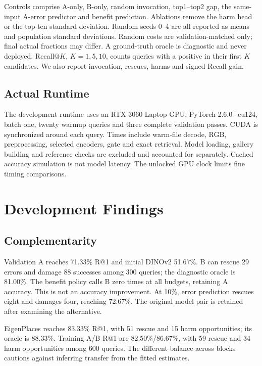 \documentclass[conference]{IEEEtran}
\begin{document}
Controls comprise A-only, B-only, random invocation, top1--top2 gap,
the same-input A-error predictor and benefit prediction. Ablations remove
the harm head or the top-ten standard deviation. Random seeds 0--4 are
all reported as means and population standard deviations. Random costs
are validation-matched only; final actual fractions may differ.
A ground-truth oracle is diagnostic and never deployed. Recall@$K$,
$K=1,5,10$, counts queries with a positive in their first $K$ candidates.
We also report invocation, rescues, harms and signed Recall gain.

\subsection{Actual Runtime}
The development runtime uses an RTX 3060 Laptop GPU, PyTorch 2.6.0+cu124,
batch one, twenty warmup queries and three complete validation passes.
CUDA is synchronized around each query. Times include warm-file decode,
RGB, preprocessing, selected encoders, gate and exact retrieval. Model
loading, gallery building and reference checks are excluded and accounted
for separately. Cached accuracy simulation is not model latency.
The unlocked GPU clock limits fine timing comparisons.

\section{Development Findings}
\subsection{Complementarity}
Validation A reaches 71.33\% R@1 and initial DINOv2 51.67\%. B can rescue
29 errors and damage 88 successes among 300 queries; the diagnostic oracle
is 81.00\%. The benefit policy calls B zero times at all budgets, retaining
A accuracy. This is not an accuracy improvement. At 10\%, error prediction
rescues eight and damages four, reaching 72.67\%. The original model pair
is retained after examining the alternative.

EigenPlaces reaches 83.33\% R@1, with 51 rescue and 15 harm opportunities;
its oracle is 88.33\%. Training A/B R@1 are 82.50\%/86.67\%, with 59 rescue
and 34 harm opportunities among 600 queries. The different balance across
blocks cautions against inferring transfer from the fitted estimates.
\end{document}
